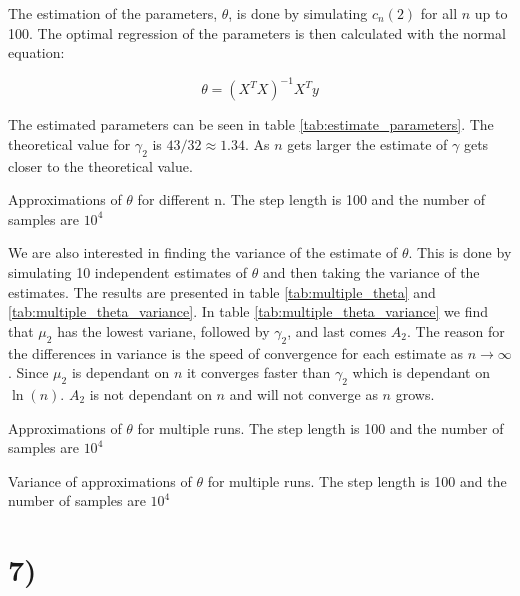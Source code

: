\documentclass[a4paper]{article}
\begin{document}
The estimation of the parameters, $\theta$, is done by simulating $c_n(2)$ for all $n$ up to 100. The optimal regression of the parameters is then calculated with the normal equation:

\begin{equation}
    \theta = (X^T X)^{-1}X^T y    
\end{equation}

The estimated parameters can be seen in table \ref{tab:estimate_parameters}. The theoretical value for $\gamma_2$ is $43/32 \approx 1.34$. As $n$ gets larger the estimate of $\gamma$ gets closer to the theoretical value.

\begin{table}[H]
    \centering
    \caption{Approximations of $\theta$ for different n. The step length is 100 and the number of samples are $10^4$}
    \label{tab:estimate_parameters}
    
\end{table}

We are also interested in finding the variance of the estimate of $\theta$. This is done by simulating 10 independent estimates of $\theta$ and then taking the variance of the estimates. The results are presented in table \ref{tab:multiple_theta} and \ref{tab:multiple_theta_variance}. In table \ref{tab:multiple_theta_variance} we find that $\mu_2$ has the lowest variane, followed by $\gamma_2$, and last comes $A_2$. The reason for the differences in variance is the speed of convergence for each estimate as $n \to \infty$. Since $\mu_2$ is dependant on $n$ it converges faster than $\gamma_2$ which is dependant on $\ln(n)$. $A_2$ is not dependant on $n$ and will not converge as $n$ grows.

\begin{table}[H]
    \centering
    \caption{Approximations of $\theta$ for multiple runs. The step length is 100 and the number of samples are $10^4$}
    \label{tab:multiple_theta}
    
\end{table}

\begin{table}[H]
    \centering
    \caption{Variance of approximations of $\theta$ for multiple runs. The step length is 100 and the number of samples are $10^4$}
    \label{tab:multiple_theta_variance}
    
\end{table}

\section*{7)}
\end{document}
